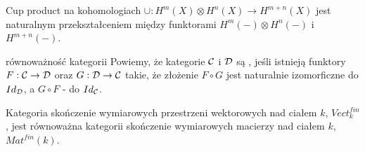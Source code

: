 \begin{example}
  Cup product na kohomologiach $\cup:H^m(X)\otimes H^n(X)\to H^{m+n}(X)$ jest naturalnym przekształceniem między funktorami $H^m(-)\otimes H^n(-)$ i $H^{m+n}(-)$.
\end{example}

\begin{definition}{równoważność kategorii}{}
  Powiemy, że kategorie $\mathcal{C}$ i $\mathcal{D}$ są , jeśli istnieją funktory $F:\mathcal{C}\to\mathcal{D}$ oraz $G:\mathcal{D}\to\mathcal{C}$ takie, że złożenie $F\circ G$ jest naturalnie izomorficzne do $Id_{\mathcal{D}}$, a $G\circ F$ - do $Id_{\mathcal{C}}$.
\end{definition}

\begin{example}
  Kategoria skończenie wymiarowych przestrzeni wektorowych nad ciałem $k$, $Vect_{k}^{fin}$, jest równoważna kategorii skończenie wymiarowych macierzy nad ciałem $k$, $Mat^{fin}(k)$.
\end{example}


